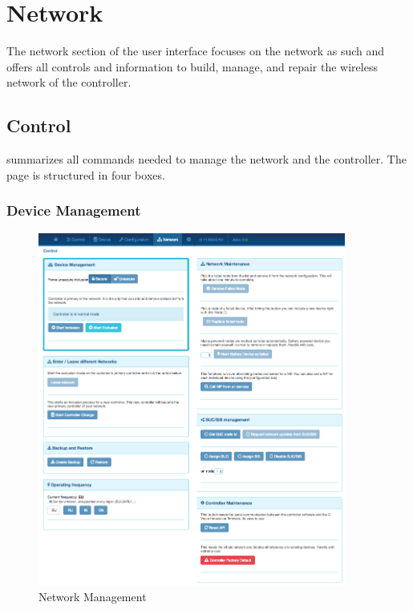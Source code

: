 \section{Network}

The network section of the user interface focuses on the network as such and offers all 
controls and information to build, manage, and repair the wireless network of the controller.

\subsection{Control}

 summarizes all commands needed to manage the network and the controller.
The page is structured in four boxes.

\subsubsection{Device Management}


\begin{figure}
\begin{center}
\includegraphics[width=0.9\textwidth]{pngs/cap7/eui21.png}
\caption{Network Management}
\label{eui21}
\end{center}
\end{figure}

